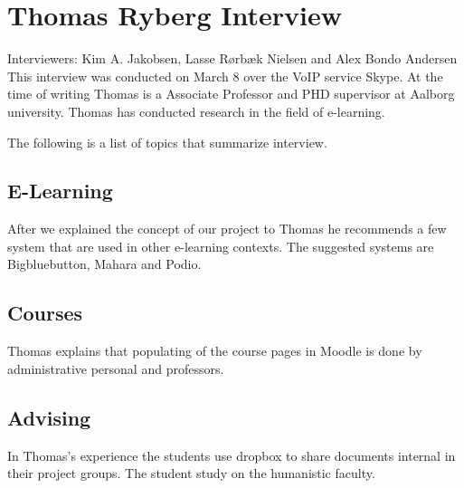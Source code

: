 \section{Thomas Ryberg Interview}
\label{sec:thomas}
Interviewers: Kim A. Jakobsen, Lasse Rørbæk Nielsen and Alex Bondo Andersen\\

This interview was conducted on March 8\ths{} over the VoIP service Skype.
At the time of writing Thomas is a Associate Professor and PHD supervisor at Aalborg university.
Thomas has conducted research in the field of e-learning.

The following is a list of topics that summarize interview.

\subsection*{E-Learning}
After we explained the concept of our project to Thomas he recommends a few system that are used in other e-learning contexts.
The suggested systems are Bigbluebutton, Mahara and Podio.


\subsection*{Courses}
Thomas explains that populating of the course pages in Moodle is done by administrative personal and professors.


\subsection*{Advising}
In Thomas's experience the students use dropbox to share documents internal in their project groups. The student study on the humanistic faculty.  
